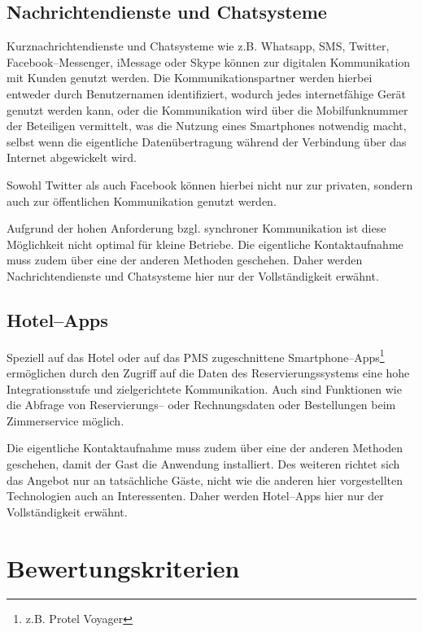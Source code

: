 \subsection{Nachrichtendienste und Chatsysteme} %
\label{sub:internet_nachrichtendienste}
Kurznachrichtendienste und Chatsysteme wie z.B. Whatsapp, SMS, Twitter, Facebook–Messenger, iMessage oder Skype können zur digitalen Kommunikation mit Kunden genutzt werden. Die Kommunikationspartner werden hierbei entweder durch Benutzernamen identifiziert, wodurch jedes internetfähige Gerät genutzt werden kann, oder die Kommunikation wird über die Mobilfunknummer der Beteiligen vermittelt, was die Nutzung eines Smartphones notwendig macht, selbst wenn die eigentliche Datenübertragung während der Verbindung über das Internet abgewickelt wird.

Sowohl Twitter als auch Facebook können hierbei nicht nur zur privaten, sondern auch zur öffentlichen Kommunikation genutzt werden.

Aufgrund der hohen Anforderung bzgl. synchroner Kommunikation ist diese Möglichkeit nicht optimal für kleine Betriebe. Die eigentliche Kontaktaufnahme muss zudem über eine der anderen Methoden geschehen. Daher werden Nachrichtendienste und Chatsysteme hier nur der Vollständigkeit erwähnt.

\subsection{Hotel--Apps} %
\label{sub:hotel_apps}
Speziell auf das Hotel oder auf das \ac{PMS} zugeschnittene Smartphone–Apps\footnote{z.B. Protel Voyager} ermöglichen durch den Zugriff auf die Daten des Reservierungssystems eine hohe Integrationsstufe und zielgerichtete Kommunikation. Auch sind Funktionen wie die Abfrage von Reservierungs– oder Rechnungsdaten oder Bestellungen beim Zimmerservice möglich.

Die eigentliche Kontaktaufnahme muss zudem über eine der anderen Methoden geschehen, damit der Gast die Anwendung installiert. Des  weiteren richtet sich das Angebot nur an tatsächliche Gäste, nicht wie die anderen hier vorgestellten Technologien auch an Interessenten. Daher werden Hotel–Apps hier nur der Vollständigkeit erwähnt.




\newpage
\section{Bewertungskriterien} %
\label{sec:kriterien}

